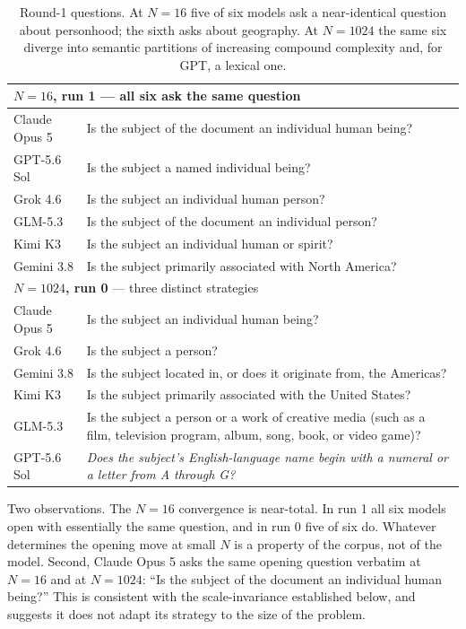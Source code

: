 \documentclass[11pt]{article}
\begin{document}
\begin{table}[h]
\centering\footnotesize
\begin{tabular}{p{2.6cm}p{10.5cm}}
\toprule
\multicolumn{2}{l}{\textbf{$N=16$, run 1} --- all six ask the same question} \\
\midrule
Claude Opus 5 & Is the subject of the document an individual human being? \\
GPT-5.6 Sol & Is the subject a named individual being? \\
Grok 4.6 & Is the subject an individual human person? \\
GLM-5.3 & Is the subject of the document an individual person? \\
Kimi K3 & Is the subject an individual human or spirit? \\
Gemini 3.8 & Is the subject primarily associated with North America? \\
\midrule
\multicolumn{2}{l}{\textbf{$N=1024$, run 0} --- three distinct strategies} \\
\midrule
Claude Opus 5 & Is the subject an individual human being? \\
Grok 4.6 & Is the subject a person? \\
Gemini 3.8 & Is the subject located in, or does it originate from, the Americas? \\
Kimi K3 & Is the subject primarily associated with the United States? \\
GLM-5.3 & Is the subject a person or a work of creative media (such as a film,
  television program, album, song, book, or video game)? \\
GPT-5.6 Sol & \emph{Does the subject's English-language name begin with a
  numeral or a letter from A through G?} \\
\bottomrule
\end{tabular}
\caption{Round-1 questions. At $N{=}16$ five of six models ask a near-identical
question about personhood; the sixth asks about geography. At $N{=}1024$ the
same six diverge into semantic partitions of increasing compound complexity and,
for GPT, a lexical one.}
\end{table}

Two observations. The $N{=}16$ convergence is near-total. In run 1 all six
models open with essentially the same question, and in run 0 five of six do.
Whatever determines the opening move at small $N$ is a property of the corpus,
not of the model. Second, Claude Opus 5 asks the same opening question verbatim
at $N{=}16$ and at $N{=}1024$: ``Is the subject of the document an individual
human being?'' This is consistent with the scale-invariance established below,
and suggests it does not adapt its strategy to the size of the problem.
\end{document}
